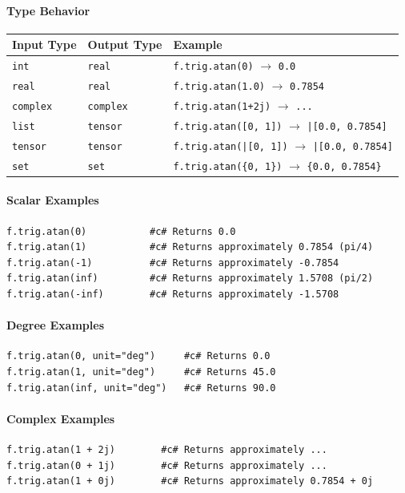 \paragraph{Type Behavior}
\begin{center}
\begin{tabular}{lll}
\textbf{Input Type} & \textbf{Output Type} & \textbf{Example} \\ \hline
\texttt{int} & \texttt{real} & \texttt{f.trig.atan(0)} $\to$ \texttt{0.0} \\
\texttt{real} & \texttt{real} & \texttt{f.trig.atan(1.0)} $\to$ \texttt{0.7854} \\
\texttt{complex} & \texttt{complex} & \texttt{f.trig.atan(1+2j)} $\to$ \texttt{...} \\
\texttt{list} & \texttt{tensor} & \texttt{f.trig.atan([0, 1])} $\to$ \texttt{|[0.0, 0.7854]} \\
\texttt{tensor} & \texttt{tensor} & \texttt{f.trig.atan(|[0, 1])} $\to$ \texttt{|[0.0, 0.7854]} \\
\texttt{set} & \texttt{set} & \texttt{f.trig.atan(\{0, 1\})} $\to$ \texttt{\{0.0, 0.7854\}} \\
\end{tabular}
\end{center}

\paragraph{Scalar Examples}
\begin{verbatim}
f.trig.atan(0)           #c# Returns 0.0
f.trig.atan(1)           #c# Returns approximately 0.7854 (pi/4)
f.trig.atan(-1)          #c# Returns approximately -0.7854
f.trig.atan(inf)         #c# Returns approximately 1.5708 (pi/2)
f.trig.atan(-inf)        #c# Returns approximately -1.5708
\end{verbatim}

\paragraph{Degree Examples}
\begin{verbatim}
f.trig.atan(0, unit="deg")     #c# Returns 0.0
f.trig.atan(1, unit="deg")     #c# Returns 45.0
f.trig.atan(inf, unit="deg")   #c# Returns 90.0
\end{verbatim}

\paragraph{Complex Examples}
\begin{verbatim}
f.trig.atan(1 + 2j)        #c# Returns approximately ...
f.trig.atan(0 + 1j)        #c# Returns approximately ...
f.trig.atan(1 + 0j)        #c# Returns approximately 0.7854 + 0j
\end{verbatim}

